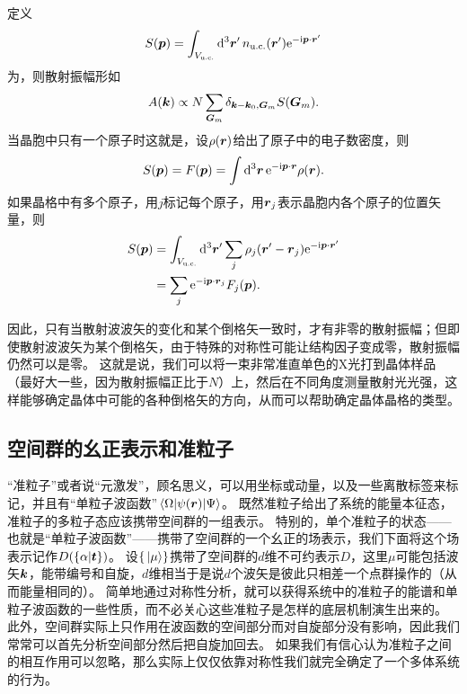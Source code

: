 定义
\begin{equation}
    S(\vb*{p}) = \int_{V_{\text{u.c.}}} \dd[3]{\vb*{r}'} n_\text{u.c.}(\vb*{r}') \mathrm{e}^{-\mathrm{i} \vb*{p} \cdot \vb*{r}'}
\end{equation}
为，则散射振幅形如
\begin{equation}
    A(\vb*{k}) \propto N \sum_{\vb*{G}_m} \delta_{\vb*{k} - \vb*{k}_0, \vb*{G}_m} S(\vb*{G}_m).
\end{equation}
当晶胞中只有一个原子时这就是，设$\rho(\vb*{r})$给出了原子中的电子数密度，则
\begin{equation}
    S(\vb*{p}) = F(\vb*{p}) = \int \dd[3]{\vb*{r}} \mathrm{e}^{-\mathrm{i} \vb*{p} \cdot \vb*{r}} \rho(\vb*{r}).
\end{equation}
如果晶格中有多个原子，用$j$标记每个原子，用$\vb*{r}_j$表示晶胞内各个原子的位置矢量，则
\begin{equation}
    \begin{aligned}
        S(\vb*{p}) &= \int_{V_{\text{u.c.}}} \dd[3]{\vb*{r}'} \sum_j \rho_j(\vb*{r}' - \vb*{r}_j) \mathrm{e}^{-\mathrm{i} \vb*{p} \cdot \vb*{r}'} \\
        &= \sum_j \mathrm{e}^{-\mathrm{i} \vb*{p} \cdot \vb*{r}_j} F_j(\vb*{p}).
    \end{aligned}
\end{equation}

因此，只有当散射波波矢的变化和某个倒格矢一致时，才有非零的散射振幅；但即使散射波波矢为某个倒格矢，由于特殊的对称性可能让结构因子变成零，散射振幅仍然可以是零。
这就是说，我们可以将一束非常准直单色的X光打到晶体样品（最好大一些，因为散射振幅正比于$N$）上，然后在不同角度测量散射光光强，这样能够确定晶体中可能的各种倒格矢的方向，从而可以帮助确定晶体晶格的类型。

\subsection{空间群的幺正表示和准粒子}

“准粒子”或者说“元激发”，顾名思义，可以用坐标或动量，以及一些离散标签来标记，并且有“单粒子波函数”$\mel{\Omega}{\psi(\vb*{r})}{\Psi}$。
既然准粒子给出了系统的能量本征态，准粒子的多粒子态应该携带空间群的一组表示。
特别的，单个准粒子的状态——也就是“单粒子波函数”——携带了空间群的一个幺正的场表示，我们下面将这个场表示记作$D(\{\alpha | \vb*{t}\})$。
设$\{\ket*{\mu}\}$携带了空间群的$d$维不可约表示$D$，这里$\mu$可能包括波矢$\vb*{k}$，能带编号和自旋，$d$维相当于是说$d$个波矢是彼此只相差一个点群操作的（从而能量相同的）。
简单地通过对称性分析，就可以获得系统中的准粒子的能谱和单粒子波函数的一些性质，而不必关心这些准粒子是怎样的底层机制演生出来的。
此外，空间群实际上只作用在波函数的空间部分而对自旋部分没有影响，因此我们常常可以首先分析空间部分然后把自旋加回去。
如果我们有信心认为准粒子之间的相互作用可以忽略，那么实际上仅仅依靠对称性我们就完全确定了一个多体系统的行为。

